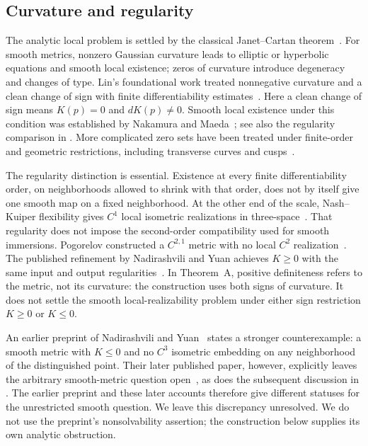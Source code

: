 \documentclass[11pt]{amsart}
\theoremstyle{definition}
\theoremstyle{remark}
\numberwithin{equation}{section}
\begin{document}
\subsection*{Curvature and regularity}
The analytic local problem is settled by the classical Janet--Cartan
theorem~\cite{Janet1926,Cartan1927}. For smooth metrics, nonzero
Gaussian curvature leads to elliptic or hyperbolic equations and
smooth local existence; zeros of curvature introduce degeneracy
and changes of type. Lin's foundational work treated nonnegative
curvature and a clean change of sign with finite differentiability
estimates~\cite{Lin1985,Lin1986}. Here a clean change of sign means
\(K(p)=0\) and \(dK(p)\ne0\). Smooth local existence under
this condition was established by Nakamura and Maeda~\cite{NakamuraMaeda1989};
see also the regularity comparison in \cite[p.~320]{NY2008}.
More complicated zero sets have been treated under finite-order
and geometric restrictions, including transverse curves and
cusps~\cite[Theorem~1.1]{HanKhuri2010}\cite[Theorem~1.1]{Lin2015}.

The regularity distinction is essential. Existence at every finite
differentiability order, on neighborhoods allowed to shrink with
that order, does not by itself give one smooth map on a fixed
neighborhood. At the other end of the scale, Nash--Kuiper
flexibility gives \(C^1\) local isometric realizations in
three-space~\cite{Nash1954,Kuiper1955}. That regularity does not
impose the second-order compatibility used for smooth immersions.
Pogorelov constructed a \(C^{2,1}\) metric with no local \(C^2\)
realization~\cite[paragraph~7]{Pogorelov1971}.
The published refinement by Nadirashvili and Yuan achieves
\(K\ge0\) with the same input and output
regularities~\cite[Theorem~1.1]{NY2008}.
In Theorem~A, positive definiteness refers to the metric, not its
curvature: the construction uses both signs of curvature.
It does not settle the smooth local-realizability problem under
either sign restriction \(K\ge0\) or \(K\le0\).

An earlier preprint of Nadirashvili and Yuan~\cite[Theorem~1.1]{NY2002}
states a stronger
counterexample: a smooth metric with \(K\le0\) and no \(C^3\)
isometric embedding on any neighborhood of the distinguished
point. Their later published paper, however, explicitly leaves
the arbitrary smooth-metric question open~\cite[p.~320]{NY2008},
as does the subsequent discussion in
\cite[p.~650]{HanKhuri2010}. The earlier preprint and these
later accounts therefore give different statuses for the unrestricted
smooth question. We leave this discrepancy unresolved.
We do not use the preprint's nonsolvability assertion;
the construction below supplies its own analytic obstruction.
\end{document}
